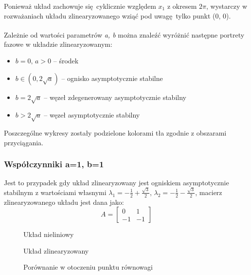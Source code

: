 \documentclass[a4paper, 10pt]{article}
\begin{document}
			Ponieważ układ zachowuje się cyklicznie względem $x_1$ z okresem $2 \pi$, wystarczy w rozważaniach układu zlinearyzowanego wziąć pod uwagę tylko punkt (0, 0).
			\\ \\
			Zależnie od wartości parametrów \textit{a, b} można znaleźć wyróżnić następne portrety fazowe w układzie zlinearyzowanym:
			\begin{itemize}
				\item[] $b = 0,\, a > 0$ -- środek 
				\item[] $b \in (0, 2\sqrt{a}) $ -- ognisko asymptotycznie stabilne
				\item[] $b = 2 \sqrt{a}$ -- węzeł zdegenerowany asymptotycznie stabilny
				\item[]	$b > 2\sqrt{a}$ -- węzeł asymptotycznie stabilny
			\end{itemize}
			Poszczególne wykresy zostały podzielone kolorami tła zgodnie z obszarami przyciągania.
			\subsubsection{Współczynniki a=1, b=1}
				Jest to przypadek gdy układ zlinearyzowany jest ogniskiem asymptotycznie stabilnym z wartościami własnymi $\lambda_1 = -\frac{1}{2} + \frac{\sqrt{3}}{2}$, $\lambda_2 = -\frac{1}{2} - \frac{\sqrt{3}}{2}$, macierz zlinearyzowanego układu jest dana jako:
				$$
					A = \begin{bmatrix}
						0 & 1 \\
						-1  & -1
					\end{bmatrix}
				$$
				\begin{figure}[H]
					\centering
					\def \svgwidth{0.8\columnwidth}
					
					\caption{Układ nieliniowy}
				\end{figure}\noindent


				\begin{figure}[H]
					\centering
					\def \svgwidth{0.8\columnwidth}
					
					\caption{Układ zlinearyzowany}
				\end{figure}\noindent


				\begin{figure}[H]
					\centering
					\def \svgwidth{0.8\columnwidth}
					
					\caption{Porównanie w otoczeniu punktu równowagi}
				\end{figure}\noindent
\end{document}
